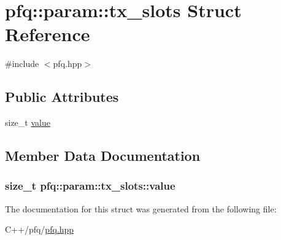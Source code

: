 \hypertarget{structpfq_1_1param_1_1tx__slots}{\section{pfq\+:\+:param\+:\+:tx\+\_\+slots Struct Reference}
\label{structpfq_1_1param_1_1tx__slots}
}


{\ttfamily \#include $<$pfq.\+hpp$>$}

\subsection*{Public Attributes}
\begin{DoxyCompactItemize}
\item 
size\+\_\+t \hyperlink{structpfq_1_1param_1_1tx__slots_a0211960e3e5bfab53d2ed6bb96445723}{value}
\end{DoxyCompactItemize}


\subsection{Member Data Documentation}
\hypertarget{structpfq_1_1param_1_1tx__slots_a0211960e3e5bfab53d2ed6bb96445723}{
\subsubsection[{value}]{\setlength{\rightskip}{0pt plus 5cm}size\+\_\+t pfq\+::param\+::tx\+\_\+slots\+::value}}\label{structpfq_1_1param_1_1tx__slots_a0211960e3e5bfab53d2ed6bb96445723}


The documentation for this struct was generated from the following file\+:\begin{DoxyCompactItemize}
\item 
C++/pfq/\hyperlink{pfq_8hpp}{pfq.\+hpp}\end{DoxyCompactItemize}
